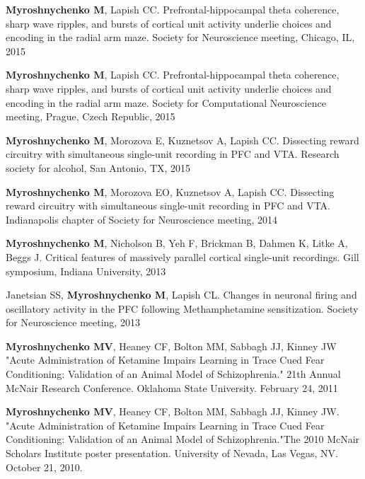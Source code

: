 \documentclass[10pt]{article}
\makeatletter
\newlength{\bibhang}
\newlength{\bibsep}
 {\@listi \global\bibsep\itemsep \global\advance\bibsep by\parsep}
\newenvironment{bibsection}%
        {\vspace{-\baselineskip}\begin{list}{}{%
       \setlength{\leftmargin}{\bibhang}%
       \setlength{\itemindent}{-\leftmargin}%
       \setlength{\itemsep}{\bibsep}%
       \setlength{\parsep}{\z@}%
        \setlength{\partopsep}{0pt}%
        \setlength{\topsep}{0pt}}}
        {\end{list}\vspace{-.6\baselineskip}}
\makeatother
\begin{document}
\begin{bibsection}
\item {\bf Myroshnychenko M},  Lapish CC. Prefrontal-hippocampal theta coherence, sharp wave ripples, and bursts of cortical unit activity underlie choices and encoding in the radial arm maze. Society for Neuroscience meeting, Chicago, IL, 2015

\item {\bf Myroshnychenko M},  Lapish CC. Prefrontal-hippocampal theta coherence, sharp wave ripples, and bursts of cortical unit activity underlie choices and encoding in the radial arm maze. Society for Computational Neuroscience meeting, Prague, Czech Republic, 2015

\item {\bf Myroshnychenko M}, Morozova E, Kuznetsov A, Lapish CC. Dissecting reward circuitry with simultaneous single-unit recording in PFC and VTA. Research society for alcohol, San Antonio, TX, 2015

\item {\bf Myroshnychenko M}, Morozova EO,  Kuznetsov A, Lapish CC. Dissecting reward circuitry with simultaneous single-unit recording in PFC and VTA. Indianapolis chapter of Society for Neuroscience meeting, 2014

\item {\bf Myroshnychenko M},  Nicholson B,  Yeh F,  Brickman B,  Dahmen K,  Litke A,  Beggs J. Critical features of massively parallel cortical single-unit recordings. Gill symposium, Indiana University, 2013


\item Janetsian SS, {\bf Myroshnychenko M}, Lapish CL. Changes in neuronal firing and oscillatory activity in the PFC following Methamphetamine sensitization. Society for Neuroscience meeting, 2013

\item {\bf Myroshnychenko MV}, Heaney CF, Bolton MM, Sabbagh JJ, Kinney JW  "Acute Administration of Ketamine Impairs Learning in
	Trace Cued Fear Conditioning: Validation of an Animal Model
	of Schizophrenia."  21th Annual McNair Research Conference. Oklahoma State University. February 24, 2011

\item {\bf Myroshnychenko MV}, Heaney CF, Bolton MM, Sabbagh JJ, Kinney JW. "Acute Administration of Ketamine Impairs Learning in
	Trace Cued Fear Conditioning: Validation of an Animal Model
	of Schizophrenia."The 2010 McNair Scholars Institute poster presentation. University of Nevada, Las Vegas, NV. October 21, 2010.
	

\end{bibsection}
\end{document}
